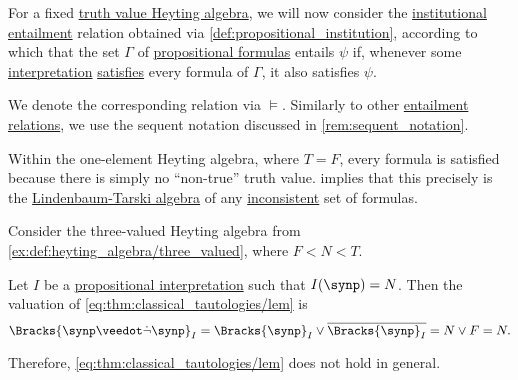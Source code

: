 \begin{definition}\label{def:propositional_entailment}\mimprovised
  For a fixed \hyperref[con:truth_value_algebra]{truth value Heyting algebra}, we will now consider the \hyperref[def:institutional_entailment]{institutional entailment} relation obtained via \cref{def:propositional_institution}, according to which that the set \( \Gamma \) of \hyperref[def:propositional_syntax/formula]{propositional formulas} entails \( \psi \) if, whenever some \hyperref[def:propositional_valuation/interpretation]{interpretation} \hyperref[thm:propositional_institution/satisfaction]{satisfies} every formula of \( \Gamma \), it also satisfies \( \psi \).

  We denote the corresponding relation via \( {\vDash} \). Similarly to other \hyperref[def:entailment_system/entailment]{entailment relations}, we use the sequent notation discussed in \cref{rem:sequent_notation}.
\end{definition}

\begin{example}\label{ex:trivial_heyting_semantics}
  Within the one-element Heyting algebra, where \( T = F \), every formula is satisfied because there is simply no \enquote{non-true} truth value.  implies that this precisely is the \hyperref[def:lindenbaum_tarski_algebra]{Lindenbaum-Tarski algebra} of any \hyperref[def:consistent_set_of_sentences]{inconsistent} set of formulas.
\end{example}

\begin{example}\label{ex:heyting_semantics_lem_counterexample}
  Consider the three-valued Heyting algebra from \cref{ex:def:heyting_algebra/three_valued}, where \( F < N < T \).

  Let \( I \) be a \hyperref[def:propositional_valuation]{propositional interpretation} such that \( I(\synp) = N \). Then the valuation of \eqref{eq:thm:classical_tautologies/lem} is
  \begin{equation*}
    \Bracks{\synp \synvee \synneg \synp}_I
    =
    \Bracks{\synp}_I \vee \oline{\Bracks{\synp}_I}
    =
    N \vee F
    =
    N.
  \end{equation*}

  Therefore, \eqref{eq:thm:classical_tautologies/lem} does not hold in general.
\end{example}


